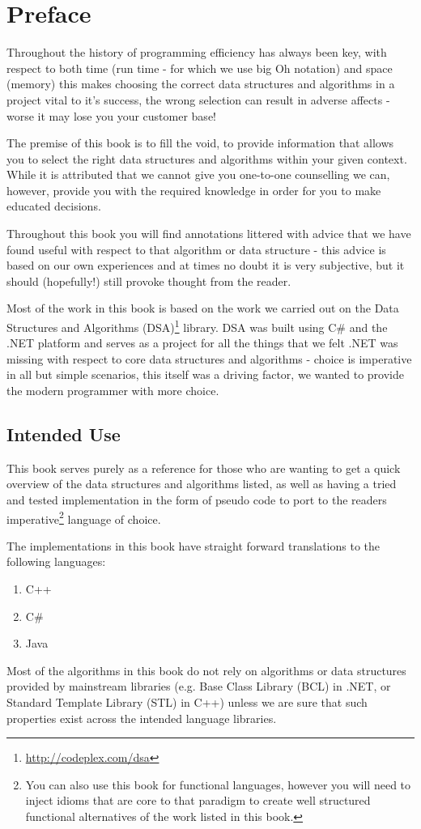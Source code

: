 \chapter*{Preface}
Throughout the history of programming efficiency has always been key, with respect to both time (run time - for which we use big Oh notation) and space (memory) this makes choosing the correct data structures and algorithms in a project vital to it's success, the wrong selection can result in adverse affects - worse it may lose you your customer base!

The premise of this book is to fill the void, to provide information that allows you to select the right data structures and algorithms within your given context. While it is attributed that we cannot give you one-to-one counselling we can, however, provide you with the required knowledge in order for you to make educated decisions.

Throughout this book you will find annotations littered with advice that we have found useful with respect to that algorithm or data structure - this advice is based on our own experiences and at times no doubt it is very subjective, but it should (hopefully!) still provoke thought from the reader.

Most of the work in this book is based on the work we carried out on the Data Structures and Algorithms (DSA)\footnote{\url{http://codeplex.com/dsa}} library. DSA was built using C\# and the .NET platform and serves as a project for all the things that we felt .NET was missing with respect to core data structures and algorithms - choice is imperative in all but simple scenarios, this itself was a driving factor, we wanted to provide the modern programmer with more choice.

\section*{Intended Use}
This book serves purely as a reference for those who are wanting to get a quick overview of the data structures and algorithms listed, as well as having a tried and tested implementation in the form of pseudo code to port to the readers imperative\footnote{You can also use this book for functional languages, however you will need to inject idioms that are core to that paradigm to create well structured functional alternatives of the work listed in this book.} language of choice.

The implementations in this book have straight forward translations to the following languages:

\begin{enumerate}
\item C++
\item C\#
\item Java
\end{enumerate}

Most of the algorithms in this book do not rely on algorithms or data structures provided by mainstream libraries (e.g. Base Class Library (BCL) in .NET, or Standard Template Library (STL) in C++) unless we are sure that such properties exist across the intended language libraries.
